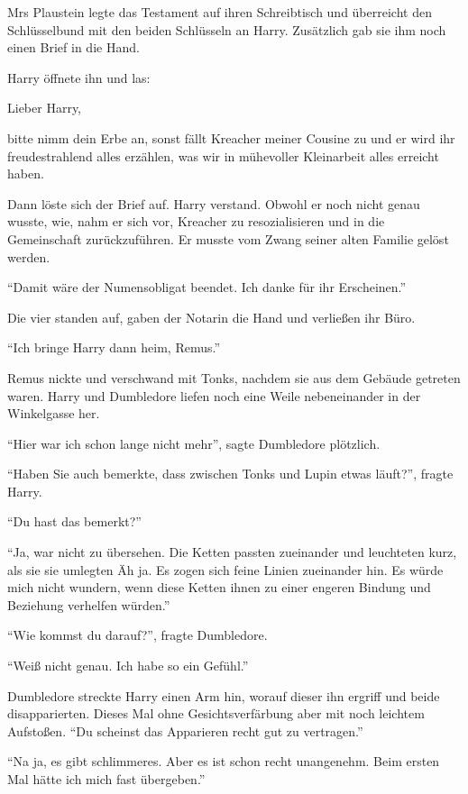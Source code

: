 Mrs Plaustein legte das Testament auf ihren Schreibtisch und überreicht den Schlüsselbund mit den beiden Schlüsseln an Harry. Zusätzlich gab sie ihm noch einen Brief in die Hand.

Harry öffnete ihn und las:

\begin{brief}
Lieber Harry,

bitte nimm dein Erbe an, sonst fällt Kreacher meiner Cousine zu und er wird ihr freudestrahlend alles erzählen, was wir in mühevoller Kleinarbeit alles erreicht haben.
\end{brief}

Dann löste sich der Brief auf. Harry verstand. Obwohl er noch nicht genau wusste, wie, nahm er sich vor, Kreacher zu resozialisieren und in die Gemeinschaft zurückzuführen. Er musste vom Zwang seiner alten Familie gelöst werden.

\enquote{Damit wäre der Numensobligat beendet. Ich danke für ihr Erscheinen.}

Die vier standen auf, gaben der Notarin die Hand und verließen ihr Büro.

\enquote{Ich bringe Harry dann heim, Remus.}

Remus nickte und verschwand mit Tonks, nachdem sie aus dem Gebäude getreten waren. Harry und Dumbledore liefen noch eine Weile nebeneinander in der Winkelgasse her.

\enquote{Hier war ich schon lange nicht mehr}, sagte Dumbledore plötzlich.

\enquote{Haben Sie auch bemerkte, dass zwischen Tonks und Lupin etwas läuft?}, fragte Harry.

\enquote{Du hast das bemerkt?}

\enquote{Ja, war nicht zu übersehen. Die Ketten passten zueinander und leuchteten kurz, als sie sie umlegten \gst Äh ja. Es zogen sich feine Linien zueinander hin. Es würde mich nicht wundern, wenn diese Ketten ihnen zu einer engeren Bindung und Beziehung verhelfen würden.}

\enquote{Wie kommst du darauf?}, fragte Dumbledore.

\enquote{Weiß nicht genau. Ich habe so ein Gefühl.}

Dumbledore streckte Harry einen Arm hin, worauf dieser ihn ergriff und beide disapparierten. Dieses Mal ohne Gesichtsverfärbung aber mit noch leichtem Aufstoßen. \enquote{Du scheinst das Apparieren recht gut zu vertragen.}

\enquote{Na ja, es gibt schlimmeres. Aber es ist schon recht unangenehm. Beim ersten Mal hätte ich mich fast übergeben.}

